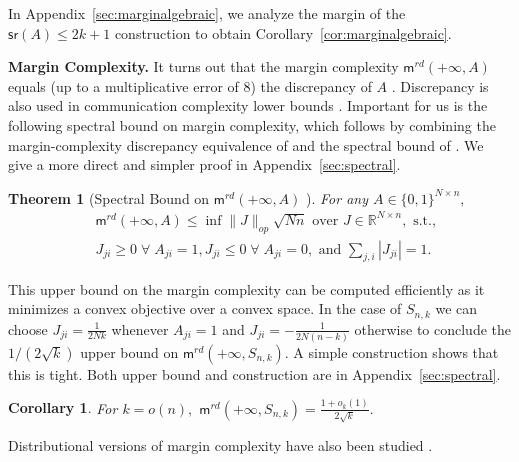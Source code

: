 \documentclass[preprint]{article}
\newtheorem{theorem}{Theorem}[section]
\newtheorem{corollary}{Corollary}[]
\newcommand{\maxmargin}{\mathsf{m}^{rd}}
\newcommand{\signrank}{\mathsf{sr}}
\newcommand{\ksparsen}{S_{n,k}}
\begin{document}
In  
Appendix~\ref{sec:marginalgebraic}, we analyze the margin of the $\signrank(A)\le 2k+1$ construction to obtain Corollary~\ref{cor:marginalgebraic}.

\textbf{Margin Complexity.} It turns out that the margin complexity $\maxmargin(+\infty, A)$ equals (up to a multiplicative error of $8$) the discrepancy of $A$ \cite{linial2009learning}. Discrepancy is also used in communication complexity lower bounds \cite{yao83LB,babai86complexity,sherstov2009lower}. Important for us is the following spectral bound on margin complexity, which follows by combining the margin-complexity discrepancy equivalence of \cite{linial2009learning} and the spectral bound of \cite{nisancc95}. We give a more direct and simpler proof in Appendix~\ref{sec:spectral}.
\begin{theorem}[Spectral Bound on $\maxmargin(+\infty, A)$ \cite{forster2002linear,sherstov2009lower,nisancc95}]\label{thm:spectralboundonmargincomplexity}
For any $A\in \{0,1\}^{N\times n},$
\begin{align*}
& \maxmargin(+\infty, A) \le \inf \|J\|_{op}\sqrt{Nn} \text{ over }J\in \mathbb{R}^{N\times n}, \text{ s.t.,}\\
& J_{ji}\ge 0\;  \forall \; A_{ji} =1, 
J_{ji}\le 0\;  \forall \; A_{ji} =0, \text{ and } 
\sum_{j,i}|J_{ji}| = 1.
\end{align*}
\end{theorem}
This
upper bound on the margin complexity can be computed efficiently as it minimizes a convex objective over a convex space. In the case of $\ksparsen$ we can choose $J_{ji} = \frac{1}{2Nk}$ whenever $A_{ji} = 1$ and $J_{ji} = -\frac{1}{2N(n-k)}$ otherwise to conclude the $1/(2\sqrt{k})$ upper bound on $\maxmargin(+\infty, \ksparsen).$ A simple construction shows that this is tight. Both upper bound and construction are in Appendix~\ref{sec:spectral}.
\begin{corollary}
\label{cor:sqrtkmargin} For $k = o(n),$
    $\maxmargin(+\infty, \ksparsen)= \frac{1+o_k(1)}{2\sqrt{k}}.$
\end{corollary}
Distributional versions of margin complexity have also been studied \cite{kamath2020approximate}.
\end{document}
